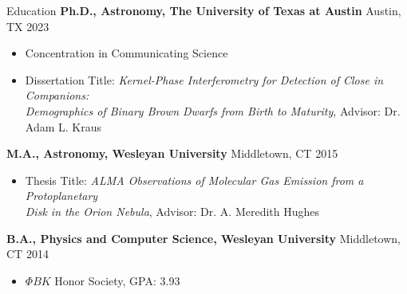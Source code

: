 \documentclass{resume} %
\begin{document}
\begin{rSection}{Education}\itemsep -5pt
    {\bf Ph.D., Astronomy, The University of Texas at Austin} \hfill {Austin, TX 2023}
    \begin{itemize}
        \vspace{-5pt}
        \setlength\itemsep{-5pt}
        \item[] Concentration in Communicating Science
        \item[] Dissertation Title: {\em Kernel-Phase Interferometry for Detection of Close in Companions:\\Demographics of Binary Brown Dwarfs from Birth to Maturity}, Advisor: Dr. Adam L. Kraus
    \end{itemize}
    \vspace{-5pt}
    
    {\bf M.A., Astronomy, Wesleyan University} \hfill Middletown, CT 2015
    \begin{itemize}
        \vspace{-5pt}
        \setlength\itemsep{-5pt}
        \item[] Thesis Title: {\em ALMA Observations of Molecular Gas Emission from a Protoplanetary\\Disk in the Orion Nebula}, Advisor: Dr. A. Meredith Hughes
    \end{itemize}
    \vspace{-5pt}
    
    {\bf B.A., Physics and Computer Science, Wesleyan University} \hfill Middletown, CT 2014
    \begin{itemize}
        \vspace{-5pt}
        \setlength\itemsep{-5pt}
        \item[] $\Phi BK$ Honor Society, GPA: 3.93
    \end{itemize}
    \vspace{-5pt}


\end{rSection}
\end{document}
